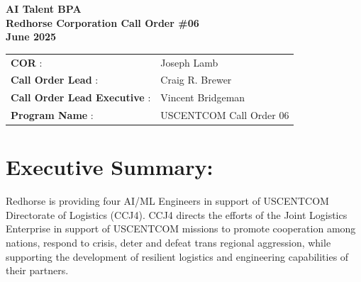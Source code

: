 \documentclass{article}
\begin{document}

\pagestyle{fancy}
\fancyhf{}
\fancyfoot[C]{\thepage}


\begin{center}
\LARGE \textbf{ AI Talent BPA } \\
\large \textbf{ Redhorse Corporation Call Order \#06 } \\
\large \textbf{ June 2025 } \\
\end{center}

\vspace{1cm}

\noindent
\begin{tabular}{@{} l l @{}}

\textbf{ COR }: & Joseph Lamb \\

\textbf{ Call Order Lead }: & Craig R. Brewer \\

\textbf{ Call Order Lead Executive }: & Vincent Bridgeman \\

\textbf{ Program Name }: & USCENTCOM Call Order 06 \\

\end{tabular}

\vspace{1.5cm}

\section*{ Executive Summary: }
\label{sec:executive_summary}
Redhorse is providing four AI/ML Engineers in support of USCENTCOM Directorate of Logistics (CCJ4).  CCJ4 directs the efforts of the Joint Logistics Enterprise in support of USCENTCOM missions to promote cooperation  among nations, respond to crisis, deter and defeat trans regional aggression, while supporting the development of  resilient logistics and engineering capabilities of their partners.
\end{document}
